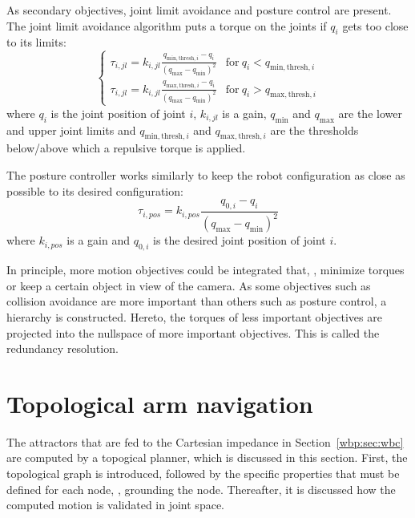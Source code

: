 As secondary objectives, joint limit avoidance and posture control are present. The joint limit avoidance algorithm puts a torque on the joints if $q_i$ gets too close to its limits:
\begin{equation}
    \left\{ \begin{array}{ll}
        \tau_{i,jl} = k_{i,jl}\frac{q_{\mathrm{min,thresh},i} - q_i}{\left( q_{\mathrm{max}} - q_{\mathrm{min}}\right)^2} & \mathrm{for}\ q_i < q_{\mathrm{min,thresh},i} \\
        \tau_{i,jl} = k_{i,jl}\frac{q_{\mathrm{max,thresh},i} - q_i}{\left( q_{\mathrm{max}} - q_{\mathrm{min}}\right)^2} & \mathrm{for}\ q_i > q_{\mathrm{max,thresh},i}
    \end{array} \right.
\end{equation}
where $q_i$ is the joint position of joint $i$, $k_{i,jl}$ is a gain, $q_{\mathrm{min}}$ and $q_{\mathrm{max}}$ are the lower and upper joint limits and $q_{\mathrm{min,thresh},i}$ and $q_{\mathrm{max,thresh},i}$ are the thresholds below/above which a repulsive torque is applied.

The posture controller works similarly to keep the robot configuration as close as possible to its desired configuration:
\begin{equation}
    \tau_{i,pos} = k_{i,pos}\frac{q_{0,i} - q_i}{\left( q_{\mathrm{max}} - q_{\mathrm{min}}\right)^2}
\end{equation}
where $k_{i,pos}$ is a gain and $q_{0,i}$ is the desired joint position of joint $i$.

In principle, more motion objectives could be integrated that, \eg, minimize torques or keep a certain object in view of the camera. 
As some objectives such as collision avoidance are more important than others such as posture control, a hierarchy is constructed. Hereto, the torques of less important objectives are projected into the nullspace of more important objectives.
This is called the redundancy resolution.

\section{Topological arm navigation}\label{wbp:sec:topological}
The attractors that are fed to the Cartesian impedance in Section~\ref{wbp:sec:wbc} are computed by a topogical planner, which is discussed in this section.
First, the topological graph is introduced, followed by the specific properties that must be defined for each node, \ie, grounding the node. Thereafter, it is discussed how the computed motion is validated in joint space.

